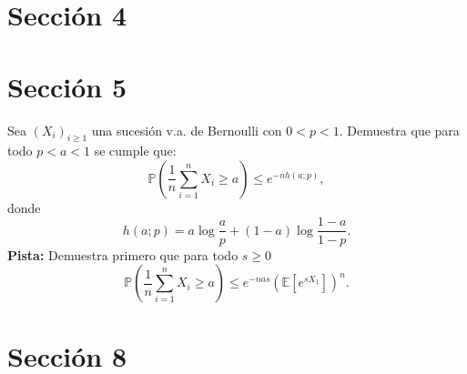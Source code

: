 \begin{ejercicio}[Libro 3.20]
\end{ejercicio}

\section{Sección 4}

\begin{ejercicio}[Libro 4.15 b)]
\end{ejercicio}

\section{Sección 5}

\begin{ejercicio}[Libro 5.4]

    Sea $(X_i)_{i \ge 1}$ una sucesión v.a. de Bernoulli con $0 < p < 1$. Demuestra que para todo $p < a < 1$ se cumple que:
    \begin{equation}
        \mathbb{P}\left( \frac{1}{n} \sum_{i=1}^{n} X_i \ge a \right) \le e^{-n h(a;p)},
    \end{equation}
    donde
    \begin{equation}
        h(a;p) = a \log \frac{a}{p} + (1 - a) \log \frac{1 - a}{1 - p}.
    \end{equation}
    \textbf{Pista:} Demuestra primero que para todo $s \ge 0$
    \begin{equation}
        \mathbb{P}\left( \frac{1}{n} \sum_{i=1}^{n} X_i \ge a \right) \le e^{-nas} \left( \mathbb{E}[e^{sX_1}] \right)^n.
    \end{equation}
\end{ejercicio}

\begin{ejercicio}[Libro 5.10]
\end{ejercicio}

\section{Sección 8}

\begin{ejercicio}[Libro 8.1]
\end{ejercicio}

